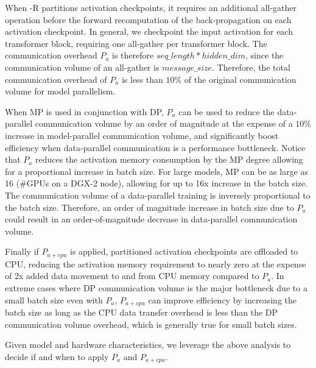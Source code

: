 When \name-R partitions activation checkpoints, it requires an additional all-gather operation before the forward recomputation of the back-propagation on each activation checkpoint. In general, we checkpoint the input activation for each transformer block, requiring one all-gather per transformer block. The communication overhead $P_a$ is therefore $seq\_length * hidden\_dim$, since the communication volume of an all-gather is $message\_size$. Therefore, the total communication overhead of $P_a$ is less than $10\%$ of the original communication volume for model parallelism.

When MP is used in conjunction with DP, $P_a$ can be used to reduce the data-parallel communication volume by an order of magnitude at the expense of a $10\%$ increase in model-parallel communication volume, and significantly boost efficiency when data-parallel communication is a performance bottleneck. Notice that $P_a$ reduces the activation memory consumption by the MP degree allowing for a proportional increase in batch size. For large models, MP can be as large as 16 (\#GPUs on a DGX-2 node), allowing for up to 16x increase in the batch size. The communication volume of a data-parallel training is inversely proportional to the batch size. Therefore, an order of magnitude increase in batch size due to $P_a$ could result in an order-of-magnitude decrease in data-parallel communication volume. 

Finally if $P_{a+cpu}$ is applied, partitioned activation checkpoints are offloaded to CPU, reducing the activation memory requirement to nearly zero at the expense of 2x added data movement to and from CPU memory compared to $P_a$. In extreme cases where DP communication volume is the major bottleneck due to a small batch size even with $P_a$, $P_{a+cpu}$ can improve efficiency by increasing the batch size as long as the CPU data transfer overhead is less than the DP communication volume overhead, which is generally true for small batch sizes.  

Given model and hardware characteristics, we leverage the above analysis to decide if and when to apply $P_a$ and $P_{a+cpu}$.  

 

